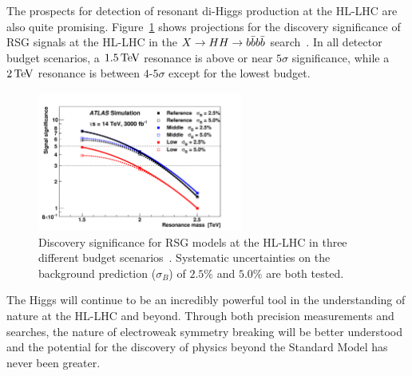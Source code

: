 The prospects for detection of resonant di-Higgs production at the HL-LHC are also quite promising. Figure~\ref{fig:HH_prospect} shows projections for the discovery significance of RSG signals at the HL-LHC in the $X\to HH \to b\bar{b}b\bar{b}$ search~\cite{ScopingDocument}. In all detector budget scenarios, a $1.5 \TeV$ resonance is above or near $5\sigma$ significance, while a $2 \TeV$ resonance is between $4$-$5\sigma$ except for the lowest budget. 
%
\begin{figure}[h!]
  \centering
  \captionsetup{justification=centering}

  \includegraphics[width=0.6\textwidth]{figures/HH_scoping}
        
   \caption{Discovery significance for RSG models at the HL-LHC in three different budget scenarios~\cite{ScopingDocument}. Systematic uncertainties on the background prediction ($\sigma_B$) of $2.5\%$ and $5.0\%$ are both tested.}
  \label{fig:HH_prospect}
\end{figure}
%

The Higgs will continue to be an incredibly powerful tool in the understanding of nature at the HL-LHC and beyond. Through both precision measurements and searches, the nature of electroweak symmetry breaking will be better understood and the potential for the discovery of physics beyond the Standard Model has never been greater. 



